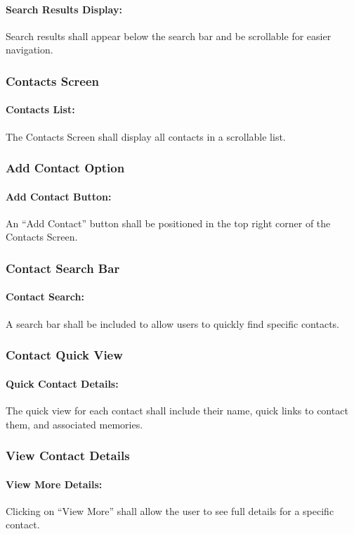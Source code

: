 \documentclass{article}
\begin{document}
\paragraph{Search Results Display:} Search results shall appear below the search bar and be scrollable for easier navigation.
\subsubsection*{Contacts Screen}
\addtocounter{subsubsection}{1}
\paragraph{Contacts List:} The Contacts Screen shall display all contacts in a scrollable list.
\subsubsection*{Add Contact Option}
\addtocounter{subsubsection}{1}
\paragraph{Add Contact Button:} An “Add Contact” button shall be positioned in the top right corner of the Contacts Screen.
\subsubsection*{Contact Search Bar}
\addtocounter{subsubsection}{1}
\paragraph{Contact Search:} A search bar shall be included to allow users to quickly find specific contacts.
\subsubsection*{Contact Quick View}
\addtocounter{subsubsection}{1}
\paragraph{Quick Contact Details:} The quick view for each contact shall include their name, quick links to contact them, and associated memories.
\subsubsection*{View Contact Details}
\addtocounter{subsubsection}{1}
\paragraph{View More Details:} Clicking on “View More” shall allow the user to see full details for a specific contact.
\end{document}
